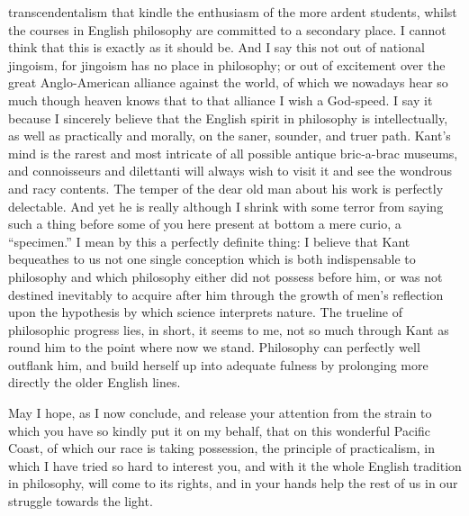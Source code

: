 \documentclass[]{article}
\begin{document}
transcendentalism that kindle the enthusiasm of the more ardent students, whilst the courses in English philosophy are committed to a secondary place. I cannot think that this is exactly as it should be. And I say this not out of national jingoism, for jingoism has no place in philosophy; or out of excitement over the great Anglo-American alliance against the world, of which we nowadays hear so much though heaven knows that to that alliance I wish a God-speed. I say it because I sincerely believe that the English spirit in philosophy is intellectually, as well as practically and morally, on the saner, sounder, and truer path. Kant's mind is the rarest and most intricate of all possible antique bric-a-brac museums, and connoisseurs and dilettanti will always wish to visit it and see the wondrous and racy contents. The temper of the dear old man about his work is perfectly delectable. And yet he is really although I shrink with some terror from saying such a thing before some of you here present at bottom a mere curio, a ``specimen.'' I mean by this a perfectly definite thing: I believe that Kant bequeathes to us not one single conception which is both indispensable to philosophy and which philosophy either did not possess before him, or was not destined inevitably to acquire after him through the growth of men's reflection upon the hypothesis by which science interprets nature. The trueline of philosophic progress lies, in short, it seems to me, not so much through Kant as round him to the point where now we stand. Philosophy can perfectly well outflank him, and build herself up into adequate fulness by prolonging more directly the older English lines. 

May I hope, as I now conclude, and release your attention from the strain to which you have so kindly put it on my behalf, that on this wonderful Pacific Coast, of which our race is taking possession, the principle of practicalism, in which I have tried so hard to interest you, and with it the whole English tradition in philosophy, will come to its rights, and in your hands help the rest of us in our struggle towards the light. 
\end{document}
